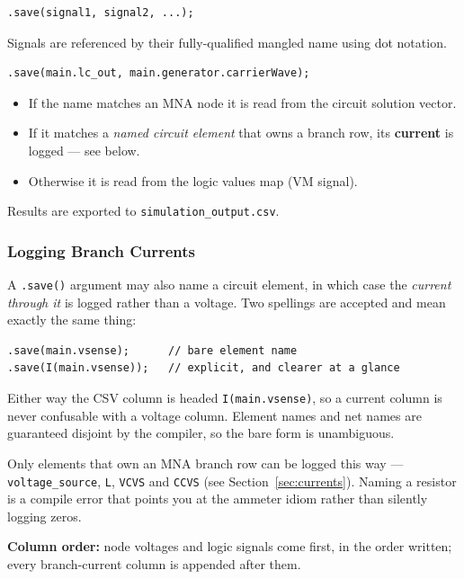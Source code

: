 \documentclass[11pt, a4paper]{article}
\newcommand{\code}[1]{\texttt{\small #1}}
\begin{document}
\begin{lstlisting}
.save(signal1, signal2, ...);
\end{lstlisting}

Signals are referenced by their fully-qualified mangled name using dot notation.

\begin{lstlisting}
.save(main.lc_out, main.generator.carrierWave);
\end{lstlisting}

\begin{itemize}
  \item If the name matches an MNA node it is read from the circuit solution
        vector.
  \item If it matches a \textit{named circuit element} that owns a branch row,
        its \textbf{current} is logged --- see below.
  \item Otherwise it is read from the logic values map (VM signal).
\end{itemize}

Results are exported to \code{simulation\_output.csv}.

\subsubsection{Logging Branch Currents}

A \code{.save()} argument may also name a circuit element, in which case the
\textit{current through it} is logged rather than a voltage. Two spellings are
accepted and mean exactly the same thing:

\begin{lstlisting}
.save(main.vsense);      // bare element name
.save(I(main.vsense));   // explicit, and clearer at a glance
\end{lstlisting}

Either way the CSV column is headed \code{I(main.vsense)}, so a current column
is never confusable with a voltage column. Element names and net names are
guaranteed disjoint by the compiler, so the bare form is unambiguous.

Only elements that own an MNA branch row can be logged this way ---
\code{voltage\_source}, \code{L}, \code{VCVS} and \code{CCVS} (see
Section~\ref{sec:currents}). Naming a resistor is a compile error that points
you at the ammeter idiom rather than silently logging zeros.

\textbf{Column order:} node voltages and logic signals come first, in the
order written; every branch-current column is appended after them.
\end{document}
